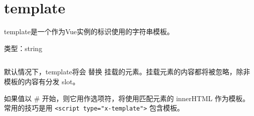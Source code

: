 \begin{lstlisting}[language=JavaScript]

\end{lstlisting}




\begin{lstlisting}[language=JavaScript]

\end{lstlisting}




\begin{lstlisting}[language=JavaScript]

\end{lstlisting}




\begin{lstlisting}[language=JavaScript]

\end{lstlisting}




\begin{lstlisting}[language=JavaScript]

\end{lstlisting}




\begin{lstlisting}[language=JavaScript]

\end{lstlisting}




\section{template}



template是一个作为Vue实例的标识使用的字符串模板。


\begin{compactitem}
\item 类型：string
\end{compactitem}




\begin{lstlisting}[language=JavaScript]

\end{lstlisting}

默认情况下，template将会 替换 挂载的元素。挂载元素的内容都将被忽略，除非模板的内容有分发 slot。

如果值以 \# 开始，则它用作选项符，将使用匹配元素的 innerHTML 作为模板。常用的技巧是用 \texttt{<script type="x-template">} 包含模板。


